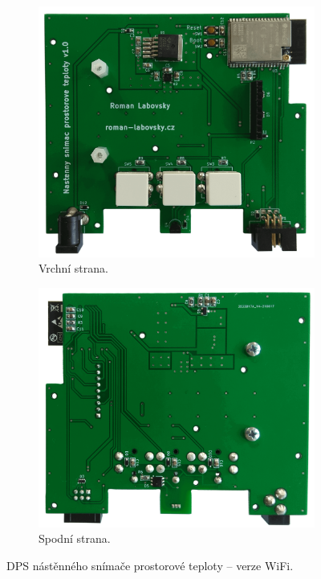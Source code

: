 \begin{figure}[H]
\centering
\begin{subfigure}{.5\textwidth}
  \centering
    \includegraphics[width=\textwidth]{images/nastenny-snimac-prostorove-teploty-wifi/dps-nastenny-snimac-prostorove-teploty-wifi-vrchni-cast.png}
    \caption{Vrchní strana.}
    \label{fig:dps-nastenny-snimac-prostorove-teploty-wifi-vrchni-cast}
\end{subfigure}%
\begin{subfigure}{.5\textwidth}
  \centering
    \includegraphics[width=\textwidth]{images/nastenny-snimac-prostorove-teploty-wifi/dps-nastenny-snimac-prostorove-teploty-wifi-spodni-cast.png}
    \caption{Spodní strana.}
    \label{fig:dps-nastenny-snimac-prostorove-teploty-wifi-spodni-cast}
\end{subfigure}
\caption{DPS nástěnného snímače prostorové teploty – verze WiFi.}
\label{fig:dps-nastenny-snimac-prostorove-teploty-wifi}
\end{figure}



